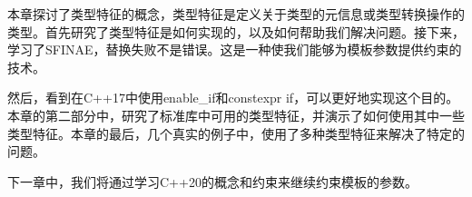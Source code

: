 本章探讨了类型特征的概念，类型特征是定义关于类型的元信息或类型转换操作的类型。首先研究了类型特征是如何实现的，以及如何帮助我们解决问题。接下来，学习了SFINAE，替换失败不是错误。这是一种使我们能够为模板参数提供约束的技术。

然后，看到在C++17中使用enable\_if和constexpr if，可以更好地实现这个目的。本章的第二部分中，研究了标准库中可用的类型特征，并演示了如何使用其中一些类型特征。本章的最后，几个真实的例子中，使用了多种类型特征来解决了特定的问题。

下一章中，我们将通过学习C++20的概念和约束来继续约束模板的参数。
